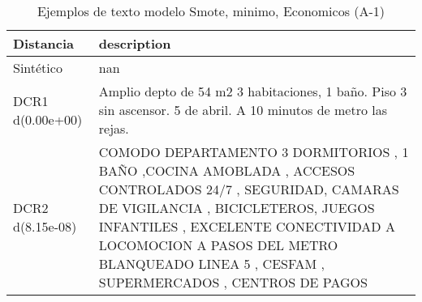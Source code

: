 \begin{table}[H]
\centering
\fontsize{10}{14}\selectfont
\caption{Ejemplos de texto modelo Smote, minimo, Economicos (A-1)}
\label{table-example-economicos-a-1-smote-enc-min-text}
\begin{tabular}{|l|m{35em}|}
\hline
\rowcolor[gray]{0.8}
Distancia & description \\
\hline Sintético & nan \\
\hline DCR1 d(0.00e+00) & Amplio depto de 54 m2 3 habitaciones, 1 ba\~no. Piso 3 sin ascensor.   5 de abril. A 10 minutos de metro las rejas. \\
\hline DCR2 d(8.15e-08) & COMODO DEPARTAMENTO 3 DORMITORIOS , 1 BA\~NO ,COCINA AMOBLADA , ACCESOS CONTROLADOS 24/7 , SEGURIDAD, CAMARAS DE VIGILANCIA , BICICLETEROS, JUEGOS INFANTILES , EXCELENTE CONECTIVIDAD A LOCOMOCION A PASOS DEL METRO BLANQUEADO LINEA 5 , CESFAM , SUPERMERCADOS , CENTROS DE PAGOS \\
\hline
\end{tabular}
\end{table}
